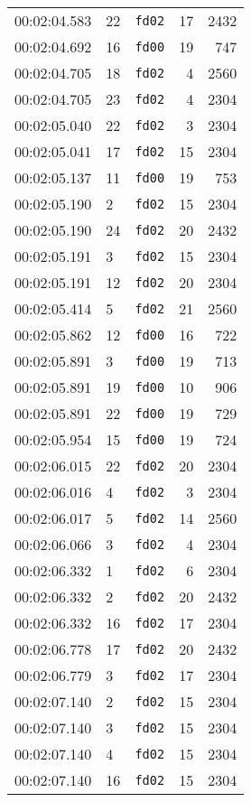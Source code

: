 \documentclass{article}
\begin{document}
\begin{longtable}{lllrr}
00:02:04.583 & 22 & \texttt{fd02} & 17 & 2432 \\
00:02:04.692 & 16 & \texttt{fd00} & 19 & 747 \\
00:02:04.705 & 18 & \texttt{fd02} & 4 & 2560 \\
00:02:04.705 & 23 & \texttt{fd02} & 4 & 2304 \\
00:02:05.040 & 22 & \texttt{fd02} & 3 & 2304 \\
00:02:05.041 & 17 & \texttt{fd02} & 15 & 2304 \\
00:02:05.137 & 11 & \texttt{fd00} & 19 & 753 \\
00:02:05.190 & 2 & \texttt{fd02} & 15 & 2304 \\
00:02:05.190 & 24 & \texttt{fd02} & 20 & 2432 \\
00:02:05.191 & 3 & \texttt{fd02} & 15 & 2304 \\
00:02:05.191 & 12 & \texttt{fd02} & 20 & 2304 \\
00:02:05.414 & 5 & \texttt{fd02} & 21 & 2560 \\
00:02:05.862 & 12 & \texttt{fd00} & 16 & 722 \\
00:02:05.891 & 3 & \texttt{fd00} & 19 & 713 \\
00:02:05.891 & 19 & \texttt{fd00} & 10 & 906 \\
00:02:05.891 & 22 & \texttt{fd00} & 19 & 729 \\
00:02:05.954 & 15 & \texttt{fd00} & 19 & 724 \\
00:02:06.015 & 22 & \texttt{fd02} & 20 & 2304 \\
00:02:06.016 & 4 & \texttt{fd02} & 3 & 2304 \\
00:02:06.017 & 5 & \texttt{fd02} & 14 & 2560 \\
00:02:06.066 & 3 & \texttt{fd02} & 4 & 2304 \\
00:02:06.332 & 1 & \texttt{fd02} & 6 & 2304 \\
00:02:06.332 & 2 & \texttt{fd02} & 20 & 2432 \\
00:02:06.332 & 16 & \texttt{fd02} & 17 & 2304 \\
00:02:06.778 & 17 & \texttt{fd02} & 20 & 2432 \\
00:02:06.779 & 3 & \texttt{fd02} & 17 & 2304 \\
00:02:07.140 & 2 & \texttt{fd02} & 15 & 2304 \\
00:02:07.140 & 3 & \texttt{fd02} & 15 & 2304 \\
00:02:07.140 & 4 & \texttt{fd02} & 15 & 2304 \\
00:02:07.140 & 16 & \texttt{fd02} & 15 & 2304 \\

\end{longtable}
\end{document}
